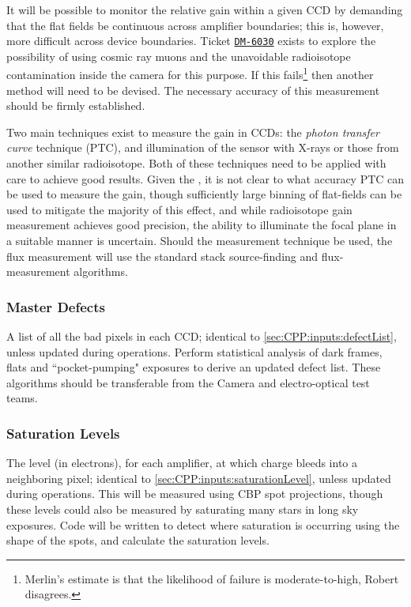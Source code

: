 It will be possible to monitor the relative gain within a given CCD by demanding that the flat fields be continuous across amplifier boundaries; this is, however, more difficult across device boundaries. Ticket \hyperref{https://jira.lsstcorp.org/browse/DM-6030}{}{}{\texttt{DM-6030}} exists to explore the possibility of using cosmic ray muons and the unavoidable radioisotope contamination inside the camera for this purpose. If this fails\footnote{ Merlin's estimate is that the likelihood of failure is moderate-to-high, Robert disagrees.} then another method will need to be devised. The necessary accuracy of this measurement should be firmly established.

Two main techniques exist to measure the gain in CCDs: the \emph{photon transfer curve} technique (PTC), and illumination of the sensor with \fefiftyfive X-rays or those from another similar radioisotope. Both of these techniques need to be applied with care to achieve good results. Given the \bfeffect, it is not clear to what accuracy PTC can be used to measure the gain, though sufficiently large binning of flat-fields can be used to mitigate the majority of this effect, and while radioisotope gain measurement achieves good precision, the ability to illuminate the focal plane in a suitable manner is uncertain. Should the \fefiftyfive measurement technique be used, the flux measurement will use the standard stack source-finding and flux-measurement algorithms.



\subsubsection{Master Defects}\label{sec:CPP:output:defectList}
A list of all the bad pixels in each CCD; identical to \secsymbol\ref{sec:CPP:inputs:defectList}, unless updated during operations.
\alg Perform statistical analysis of dark frames, flats and ``pocket-pumping" exposures to derive an updated defect list. These algorithms should be transferable from the Camera and electro-optical test teams.


\subsubsection{Saturation Levels}\label{sec:CPP:output:saturationLevel}
The level (in electrons), for each amplifier, at which charge bleeds into a neighboring pixel; identical to \secsymbol\ref{sec:CPP:inputs:saturationLevel}, unless updated during operations.
\alg This will be measured using CBP spot projections, though these levels could also be measured by saturating many stars in long sky exposures. Code will be written to detect where saturation is occurring using the shape of the spots, and calculate the saturation levels.



